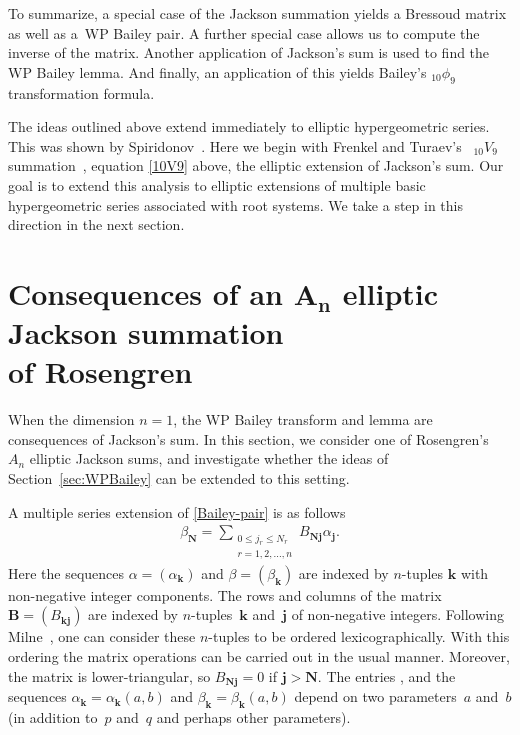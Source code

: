 \documentclass[pdftex]{sigma}
\numberwithin{equation}{section}
\newcommand{\B}{{ \mathbf B}}
\newcommand{\N}{{ \boldsymbol N}}
\renewcommand{\k}{{ \boldsymbol{k}}}
\renewcommand{\j}{{ \boldsymbol{j}}}
\newcommand{\multsum}[3]{{\sum\limits_{\substack{{0\le #1_#3 \le #2_#3} \\
{#3 =1,2,\dots, n}}}}}
\begin{document}
To summarize, a special case of the Jackson summation yields a Bressoud matrix as well as a~WP Bailey pair. A further special case allows us to compute the inverse of the matrix. Another application of Jackson's sum is used to find the WP Bailey lemma. And finally, an application of this yields Bailey's $_{10}\phi_9$ transformation formula.

The ideas outlined above extend immediately to elliptic hypergeometric series. This was shown by Spiridonov~\cite{VPS2002}. Here we begin with Frenkel and Turaev's~\cite{FT1997} $_{10}V_9$ summation~\cite[equation~(11.4.1)]{GR90}, equation \eqref{10V9} above, the elliptic extension of Jackson's sum. Our goal is to extend this analysis to elliptic extensions of multiple basic hypergeometric series associated with root systems. We take a step in this direction in the next section.

\section[Consequences of an $A_n$ elliptic Jackson summation of Rosengren]{Consequences of an $\boldsymbol{A_n}$ elliptic Jackson summation\\ of Rosengren}\label{sec:dougall1}

When the dimension $n=1$, the WP Bailey transform and lemma are consequences of Jackson's sum. In this section, we consider one of Rosengren's~\cite{HR2004} $A_n$ elliptic Jackson sums, and investigate whether the ideas of Section~\ref{sec:WPBailey} can be extended to this setting.

A multiple series extension of \eqref{Bailey-pair} is as follows
\begin{gather}\label{n-Bailey-pair}
\beta_\N=\multsum{j}{N}{r} B_{\N\j} \alpha_\j.
\end{gather}
Here the sequences $\alpha= (\alpha_\k)$ and $\beta= (\beta_\k)$ are indexed by $n$-tuples $\k$ with non-negative integer components. The rows and columns of the matrix $\B=\left(B_{\k\j}\right)$ are indexed by $n$-tuples~$\k$ and~$\j$ of non-negative integers. Following Milne~\cite{Milne1997}, one can consider these $n$-tuples to be ordered lexicographically. With this ordering the matrix operations can be carried out in the usual manner.
Moreover, the matrix is lower-triangular, so $B_{\N\j}=0$ if $\j>\N$. The entries \smash{$B_{\k\j}= B_{\k\j}(a,b)$}, and the sequences $\alpha_\k = \alpha_\k(a,b)$ and $\beta_\k = \beta_\k(a,b)$ depend on two parameters~$a$ and~$b$ (in addition to~$p$ and~$q$ and perhaps other parameters).
\end{document}
